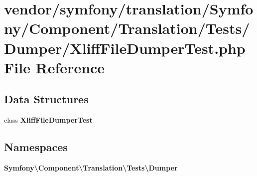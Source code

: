 \section{vendor/symfony/translation/\+Symfony/\+Component/\+Translation/\+Tests/\+Dumper/\+Xliff\+File\+Dumper\+Test.php File Reference}
\label{_xliff_file_dumper_test_8php}
\subsection*{Data Structures}
\begin{DoxyCompactItemize}
\item 
class {\bf Xliff\+File\+Dumper\+Test}
\end{DoxyCompactItemize}
\subsection*{Namespaces}
\begin{DoxyCompactItemize}
\item 
 {\bf Symfony\textbackslash{}\+Component\textbackslash{}\+Translation\textbackslash{}\+Tests\textbackslash{}\+Dumper}
\end{DoxyCompactItemize}
